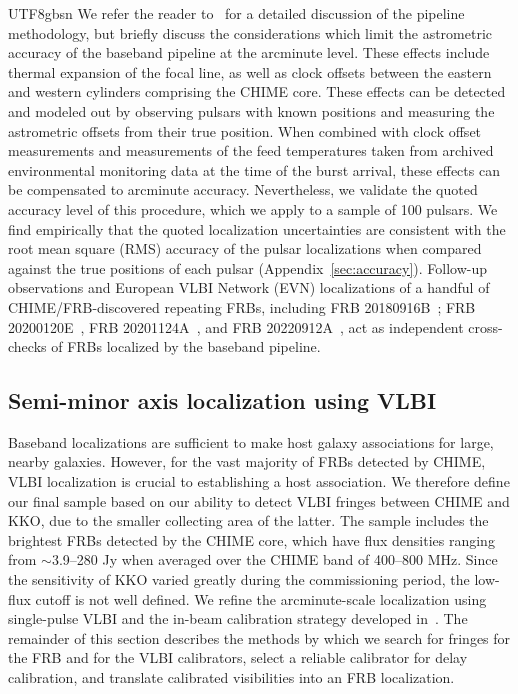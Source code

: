 \documentclass[twocolumn,linenumbers]{aastex631}
\begin{document}
\begin{CJK*}{UTF8}{gbsn}
We refer the reader to~\citet{michilli2021analysis} for a detailed discussion of the pipeline methodology, but briefly discuss the considerations which limit the astrometric accuracy of the baseband pipeline at the arcminute level. These effects include thermal expansion of the focal line, as well as clock offsets between the eastern and western cylinders comprising the CHIME core. These effects can be detected and modeled out by observing pulsars with known positions and measuring the astrometric offsets from their true position. When combined with clock offset measurements and measurements of the feed temperatures taken from archived environmental monitoring data at the time of the burst arrival, these effects can be compensated to arcminute accuracy. Nevertheless, we validate the quoted accuracy level of this procedure, which we apply to a sample of 100 pulsars. We find empirically that the quoted localization uncertainties are consistent with the root mean square (RMS) accuracy of the pulsar localizations when compared against the true positions of each pulsar (Appendix~\ref{sec:accuracy}). Follow-up observations and European VLBI Network (EVN) localizations of a handful of CHIME/FRB-discovered repeating FRBs, including FRB 20180916B~\citep{collaboration2020periodic,marcote2020repeating}; FRB 20200120E~\citep{kirsten2022repeating}, FRB 20201124A~\citep{lanman2022sudden,nimmo2022milliarcsecond}, and FRB 20220912A~\citep{mckinven2022nine,hewitt2024milliarcsecond}, act as independent cross-checks of FRBs localized by the baseband pipeline.

\subsection{Semi-minor axis localization using VLBI}
Baseband localizations are sufficient to make host galaxy associations for large, nearby galaxies. However, for the vast majority of FRBs detected by CHIME, VLBI localization is crucial to establishing a host association. We therefore define our final sample based on our ability to detect VLBI fringes between CHIME and KKO, due to the smaller collecting area of the latter. The sample includes the brightest FRBs detected by the CHIME core, which have flux densities ranging from $\sim$3.9--280 Jy when averaged over the CHIME band of 400--800 MHz. Since the sensitivity of KKO varied greatly during the commissioning period, the low-flux cutoff is not well defined. We refine the arcminute-scale localization using single-pulse VLBI and the in-beam calibration strategy developed in~\citet{leung2021synoptic}. The remainder of this section describes the methods by which we search for fringes for the FRB and for the VLBI calibrators, select a reliable calibrator for delay calibration, and translate calibrated visibilities into an FRB localization.


\end{CJK*}
\end{document}
